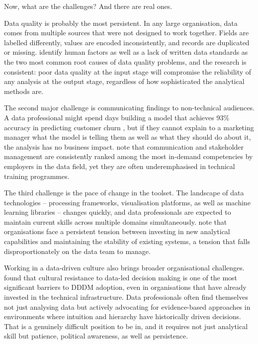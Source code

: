 \documentclass[12pt,a4paper]{article}
\begin{document}
Now, what are the challenges? And there are real ones.

Data quality is probably the most persistent. In any large organisation, data comes from multiple sources that were not designed to work together. Fields are labelled differently, values are encoded inconsistently, and records are duplicated or missing. \textcite{Li2024} identify human factors as well as a lack of written data standards as the two most common root causes of data quality problems, and the research is consistent: poor data quality at the input stage will compromise the reliability of any analysis at the output stage, regardless of how sophisticated the analytical methods are.

The second major challenge is communicating findings to non-technical audiences. A data professional might spend days building a model that achieves 93\% accuracy in predicting customer churn \parencite{Ahmad2019}, but if they cannot explain to a marketing manager what the model is telling them as well as what they should do about it, the analysis has no business impact. \textcite{Collier2024} note that communication and stakeholder management are consistently ranked among the most in-demand competencies by employers in the data field, yet they are often underemphasised in technical training programmes.

The third challenge is the pace of change in the toolset. The landscape of data technologies -- processing frameworks, visualisation platforms, as well as machine learning libraries -- changes quickly, and data professionals are expected to maintain current skills across multiple domains simultaneously. \textcite{Sabharwal2021} note that organisations face a persistent tension between investing in new analytical capabilities and maintaining the stability of existing systems, a tension that falls disproportionately on the data team to manage.

Working in a data-driven culture also brings broader organisational challenges. \textcite{Tawil2023} found that cultural resistance to data-led decision making is one of the most significant barriers to DDDM adoption, even in organisations that have already invested in the technical infrastructure. Data professionals often find themselves not just analysing data but actively advocating for evidence-based approaches in environments where intuition and hierarchy have historically driven decisions. That is a genuinely difficult position to be in, and it requires not just analytical skill but patience, political awareness, as well as persistence.
\end{document}
